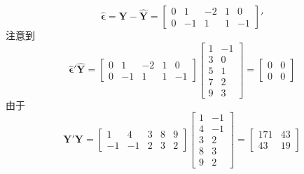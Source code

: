 \[
\hat{\boldsymbol{\epsilon}}=\mathbf{Y}-\hat{\mathbf{Y}}=\begin{bmatrix}0&1&-2&1&0\\0&-1&1&1&-1\end{bmatrix}'
\]
注意到
\[
\hat{\boldsymbol{\epsilon}}'\hat{\mathbf{Y}}=\begin{bmatrix}0&1&-2&1&0\\0&-1&1&1&-1\end{bmatrix}\begin{bmatrix}1&-1\\3&0\\5&1\\7&2\\9&3\end{bmatrix}=\begin{bmatrix}0&0\\0&0\end{bmatrix}
\]
由于
\[
\mathbf{Y}'\mathbf{Y}=\begin{bmatrix}1&4&3&8&9\\-1&-1&2&3&2\end{bmatrix}\begin{bmatrix}1&-1\\4&-1\\3&2\\8&3\\9&2\end{bmatrix}=\begin{bmatrix}171&43\\43&19\end{bmatrix}
\]

